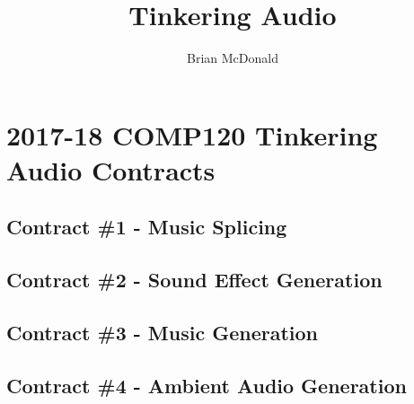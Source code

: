 \documentclass{../../fal_assignment}
\title{Tinkering Audio}
\author{Brian McDonald}
\begin{document}
\section*{2017-18 COMP120 Tinkering Audio Contracts}

\subsection*{Contract \#1 - Music Splicing}

\subsection*{Contract \#2 - Sound Effect Generation}

\subsection*{Contract \#3 - Music Generation}

\subsection*{Contract \#4 - Ambient Audio Generation}
\end{document}

